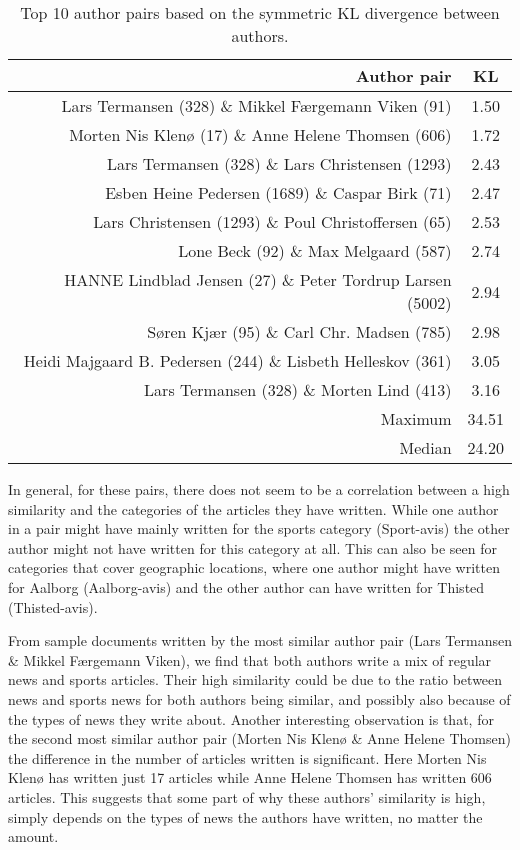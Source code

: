\begin{table}[h]
	\centering
	\caption{Top 10 author pairs based on the symmetric KL divergence between authors.}
	\begin{tabular}{r|c}
		Author pair & KL \\
		\midrule
		Lars Termansen (328) \& Mikkel Færgemann Viken (91) & 1.50 \\
		Morten Nis Klenø (17) \& Anne Helene Thomsen (606) & 1.72 \\
		Lars Termansen (328) \& Lars Christensen (1293) & 2.43 \\
		Esben Heine Pedersen (1689) \& Caspar Birk (71) & 2.47 \\
		Lars Christensen (1293) \& Poul Christoffersen (65) & 2.53 \\
		Lone Beck (92) \& Max Melgaard (587) & 2.74 \\
		HANNE Lindblad Jensen (27) \& Peter Tordrup Larsen (5002) & 2.94 \\
		Søren Kjær (95) \& Carl Chr. Madsen (785) & 2.98 \\
		Heidi Majgaard B. Pedersen (244) \& Lisbeth Helleskov (361) & 3.05 \\
		Lars Termansen (328) \& Morten Lind (413) & 3.16 \\
		\midrule
		Maximum & 34.51 \\
		Median & 24.20 \\
	\end{tabular}
	\label{tab:author_similarity}
\end{table}

In general, for these pairs, there does not seem to be a correlation between a high similarity and the categories of the articles they have written.
While one author in a pair might have mainly written for the sports category (Sport-avis) the other author might not have written for this category at all.
This can also be seen for categories that cover geographic locations, where one author might have written for Aalborg (Aalborg-avis) and the other author can have written for Thisted (Thisted-avis).

From sample documents written by the most similar author pair (Lars Termansen \& Mikkel Færgemann Viken), we find that both authors write a mix of regular news and sports articles.
Their high similarity could be due to the ratio between news and sports news for both authors being similar, and possibly also because of the types of news they write about.
Another interesting observation is that, for the second most similar author pair (Morten Nis Klenø \& Anne Helene Thomsen) the difference in the number of articles written is significant.
Here Morten Nis Klenø has written just 17 articles while Anne Helene Thomsen has written 606 articles.
This suggests that some part of why these authors' similarity is high, simply depends on the types of news the authors have written, no matter the amount.

